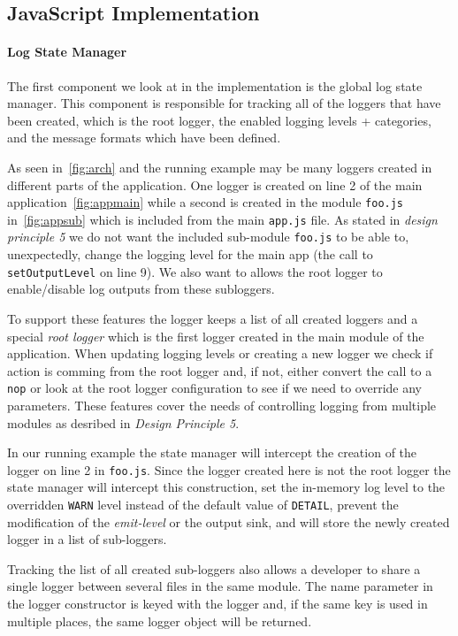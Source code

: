 \subsection{JavaScript Implementation}
\label{subsec:jsimpl}
\paragraph{Log State Manager}
\noindent
The first component we look at in the implementation is the global log state 
manager. This component is responsible for tracking all of the loggers that 
have been created, which is the root logger, the enabled logging levels + 
categories, and the message formats which have been defined. 

As seen in~\autoref{fig:arch} and the running example may be many loggers 
created in different parts of the application. One logger is created on line 
2 of the main application~\autoref{fig:appmain} while a second is created 
in the module \texttt{foo.js} in~\autoref{fig:appsub} which is included from 
the main \texttt{app.js} file. As stated in \emph{design principle 5} we 
do not want the included sub-module \texttt{foo.js} to be able to, unexpectedly, 
change the logging level for the main app (the call to \texttt{setOutputLevel} on 
line 9). We also want to allows the root logger to enable/disable log outputs 
from these subloggers. 

To support these features the \projn logger keeps a list of all created loggers 
and a special \emph{root logger} which is the first logger created in the main 
module of the application. When updating logging levels or creating a new logger 
we check if action is comming from the root logger and, if not, either convert 
the call to a \texttt{nop} or look at the root logger configuration to see if 
we need to override any parameters. These features cover the needs of controlling 
logging from multiple modules as desribed in \emph{Design Principle 5}.

In our running example the state manager will intercept the creation of the logger 
on line 2 in \texttt{foo.js}. Since the logger created here is not the root logger
the state manager will intercept this construction, set the in-memory log level to 
the overridden \texttt{WARN} level instead of the default value of \texttt{DETAIL}, 
prevent the modification of the \emph{emit-level} or the output sink, and will 
store the newly created logger in a list of sub-loggers. 

Tracking the list of all created sub-loggers also allows a developer to share a 
single logger between several files in the same module. The name parameter in the 
logger constructor is keyed with the logger and, if the same key is used in multiple 
places, the same logger object will be returned.

